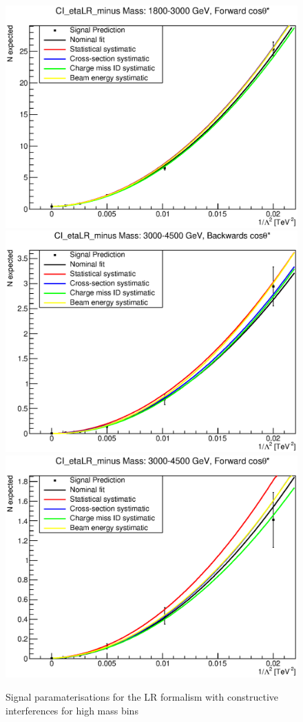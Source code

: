\begin{figure}[ht]
			\includegraphics[width=0.49\linewidth]{images/thesis_fits/CI_2D_etaLR_minus_Mass_1800-3000_GeV_CTS_0_1.eps}
			\includegraphics[width=0.49\linewidth]{images/thesis_fits/CI_2D_etaLR_minus_Mass_3000-4500_GeV_CTS_-1_0.eps}
			\includegraphics[width=0.49\linewidth]{images/thesis_fits/CI_2D_etaLR_minus_Mass_3000-4500_GeV_CTS_0_1.eps}
		\caption{Signal paramaterisations for the LR formalism with constructive interferences for high mass bins}
		\label{fig:parm_LR_m_2}
	\end{figure}



